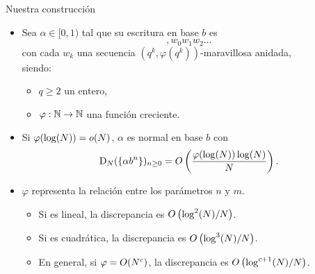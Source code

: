 \documentclass[spanish,xcolor={table}]{beamer}
\begin{document}
\begin{frame}{Nuestra construcción}
  \begin{itemize}
    \item Sea $\alpha \in [0, 1)$ tal que su escritura en base $b$ es
    \[ {,}w_0w_1w_2\dots \]
    con cada $w_k$ una secuencia $(q^k, \varphi(q^k))$-maravillosa anidada,  \\ siendo:
    \begin{itemize}
      \item $q \geq 2$ un entero,
      \item $\varphi: \mathbb{N} \to \mathbb{N}$ una función creciente.
    \end{itemize}
    \item Si $\varphi(\log(N)) = o(N)$, $\alpha$ es normal en base $b$ con
      \[ \operatorname{D}_{N}(\lbrace \alpha b^n \rbrace)_{n\geq0}
      = O\left( \frac{\varphi(\log(N))\log(N)}{N} \right). \]
    \item $\varphi$ representa la relación entre los parámetros $n$ y $m$.
      \begin{itemize}
        \item Si es lineal, la discrepancia es $O \left(\log^2(N)/N\right)$.
        \item Si es cuadrática, la discrepancia es $O \left(\log^3(N)/N\right)$.
        \item En general, si $\varphi = O(N^c)$, la discrepancia es $O \left(\log^{c+1}(N)/N\right)$.
      \end{itemize}
  \end{itemize}
\end{frame}

\end{document}
